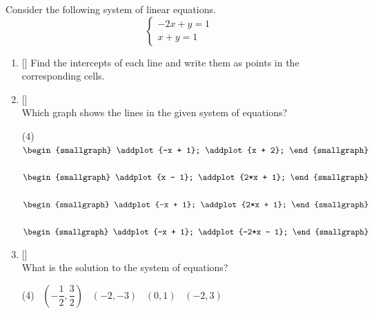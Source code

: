 \begin{question}[class=Z]
  Consider the following system of linear equations.
  \[
    \begin{cases}
      -2x + y = 1 \\
      x + y = 1
    \end{cases}
  \]
  \begin{enumerate}[label = \textbf{\alph*)}]
    \item{} [] Find the intercepts of each line and write them as points in the corresponding cells.
          \begin{center}
          \end{center}
    \item{} [] \MultipleChoiceInstructions \\[0.05in]
          Which graph shows the lines in the given system of equations?
          \begin{tasks}(4)
            \task[\choice] \ \(\begin{smallgraph} \addplot {-x + 1}; \addplot {x + 2}; \end{smallgraph}\)
            \task[\choice] \ \(\begin{smallgraph} \addplot {x - 1}; \addplot {2*x + 1}; \end{smallgraph}\)
            \task[\correctchoice] \ \(\begin{smallgraph} \addplot {-x + 1}; \addplot {2*x + 1}; \end{smallgraph}\)
            \task[\choice] \ \(\begin{smallgraph} \addplot {-x + 1}; \addplot {-2*x - 1}; \end{smallgraph}\)
          \end{tasks}
    \item{} [] \MultipleChoiceInstructions \\[0.05in]
          What is the solution to the system of equations?
          \begin{tasks}(4)
            \task[\choice] \ \(\left(-\dfrac{1}{2}, \dfrac{3}{2}\right)\)
            \task[\choice] \ \((-2,-3)\)
            \task[\correctchoice] \ \((0,1)\)
            \task[\choice] \ \((-2,3)\)
          \end{tasks}
  \end{enumerate}
\end{question}
